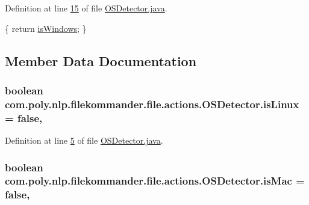 Definition at line \hyperlink{L15}{15} of file \hyperlink{}{O\-S\-Detector.\-java}.


\begin{DoxyCode}
                                      \{
        \textcolor{keywordflow}{return} \hyperlink{classcom_1_1poly_1_1nlp_1_1filekommander_1_1file_1_1actions_1_1_o_s_detector_ac64c693bb806da889cf3eefc41a4294a}{isWindows};
    \}
\end{DoxyCode}


\subsection{Member Data Documentation}
\hypertarget{classcom_1_1poly_1_1nlp_1_1filekommander_1_1file_1_1actions_1_1_o_s_detector_a22ec143bd07db6e90565820d45099d16}{
\subsubsection[{is\-Linux}]{\setlength{\rightskip}{0pt plus 5cm}boolean com.\-poly.\-nlp.\-filekommander.\-file.\-actions.\-O\-S\-Detector.\-is\-Linux = false\hspace{0.3cm}{\ttfamily [static]}, {\ttfamily [private]}}}\label{classcom_1_1poly_1_1nlp_1_1filekommander_1_1file_1_1actions_1_1_o_s_detector_a22ec143bd07db6e90565820d45099d16}


Definition at line \hyperlink{L5}{5} of file \hyperlink{}{O\-S\-Detector.\-java}.

\hypertarget{classcom_1_1poly_1_1nlp_1_1filekommander_1_1file_1_1actions_1_1_o_s_detector_a1340febacdcad32dd61d018c21c6bb1f}{
\subsubsection[{is\-Mac}]{\setlength{\rightskip}{0pt plus 5cm}boolean com.\-poly.\-nlp.\-filekommander.\-file.\-actions.\-O\-S\-Detector.\-is\-Mac = false\hspace{0.3cm}{\ttfamily [static]}, {\ttfamily [private]}}}\label{classcom_1_1poly_1_1nlp_1_1filekommander_1_1file_1_1actions_1_1_o_s_detector_a1340febacdcad32dd61d018c21c6bb1f}


